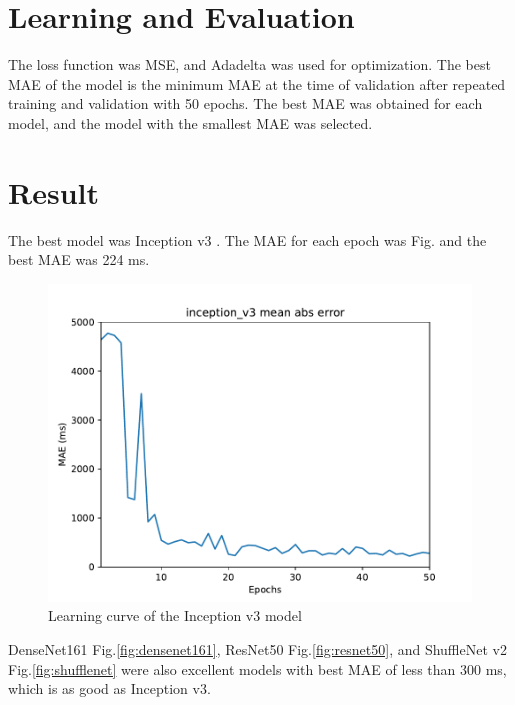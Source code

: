 \documentclass[10pt,twocolumn,letterpaper]{article}
\begin{document}
\section{Learning and Evaluation}
The loss function was MSE, and Adadelta \cite{zeiler2012adadelta} was used for optimization.
The best MAE of the model is the minimum MAE at the time of validation after repeated training and validation with 50 epochs. The best MAE was obtained for each model,
and the model with the smallest MAE was selected.

\section{Result}
The best model was Inception v3 \cite{szegedy2016rethinking}.
The MAE for each epoch was Fig. and the best MAE was 224 ms.

\begin{figure}[h]
    \begin{center}
        \includegraphics[width=0.8\linewidth]{images/inception_v3.pdf}
    \end{center}
    \caption{Learning curve of the Inception v3 model}
    \label{fig:inception_v3}
\end{figure}

DenseNet161 \cite{huang2017densely} Fig.\ref{fig:densenet161}, ResNet50 \cite{he2016deep} Fig.\ref{fig:resnet50}, and ShuffleNet v2 \cite{ma2018shufflenet} Fig.\ref{fig:shufflenet} were also excellent models
with best MAE of less than 300 ms, which is as good as Inception v3.
\end{document}
